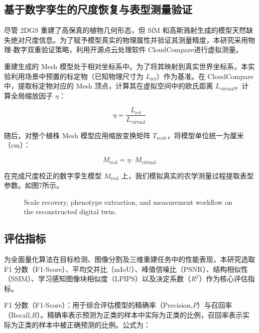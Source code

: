 \documentclass[preprint,12pt]{elsarticle}
\begin{document}
\subsection{基于数字孪生的尺度恢复与表型测量验证}

尽管 2DGS 重建了高保真的植物几何形态，但 SfM 和高斯溅射生成的模型天然缺失绝对尺度信息。为了赋予模型真实的物理属性并验证其测量精度，本研究采用物理-数字双重验证策略，利用开源点云处理软件 CloudCompare进行虚拟测量。

重建生成的 Mesh 模型处于相对坐标系中。为了将其映射到真实世界坐标系，本实验利用场景中预置的标定物（已知物理尺寸为 ${L}_{\mathrm{ref}}$）作为基准。在 CloudCompare 中，提取标定物对应的 Mesh 顶点，计算其在虚拟空间中的欧氏距离 ${L}_{\mathrm{virtual}}$。计算全局缩放因子 $\eta$：

\begin{equation}
\eta=\frac{{L}_{\mathrm{ref}}}{{L}_{\mathrm{virtual}}}
\end{equation}

随后，对整个植株 Mesh 模型应用缩放变换矩阵 ${T}_{\mathrm{scale}}$，将模型单位统一为厘米（cm）：

\begin{equation}
{M}_{\mathrm{real}}=\eta\cdot{M}_{\mathrm{virtual}}
\end{equation}

在完成尺度校正的数字孪生模型 ${M}_{\mathrm{real}}$ 上，我们模拟真实的农学测量过程提取表型参数。如图7所示。

\begin{figure}[t]
\centering
\caption{Scale recovery, phenotype extraction, and measurement workflow on the reconstructed digital twin.}
\label{fig:image13}
\end{figure}

\subsection{评估指标}

为全面量化算法在目标检测、图像分割及三维重建任务中的性能表现，本研究选取F1 分数（F1-Score）、平均交并比（mIoU）、峰值信噪比（PSNR）、结构相似性（SSIM）、学习感知图像块相似度（LPIPS）以及决定系数（${R}^{2}$）作为核心评估指标。

F1 分数（F1-Score）：用于综合评估模型的精确率（Precision,$P$）与召回率（Recall,$R$）。精确率表示预测为正类的样本中实际为正类的比例，召回率表示实际为正类的样本中被正确预测的比例。公式为：
\end{document}
